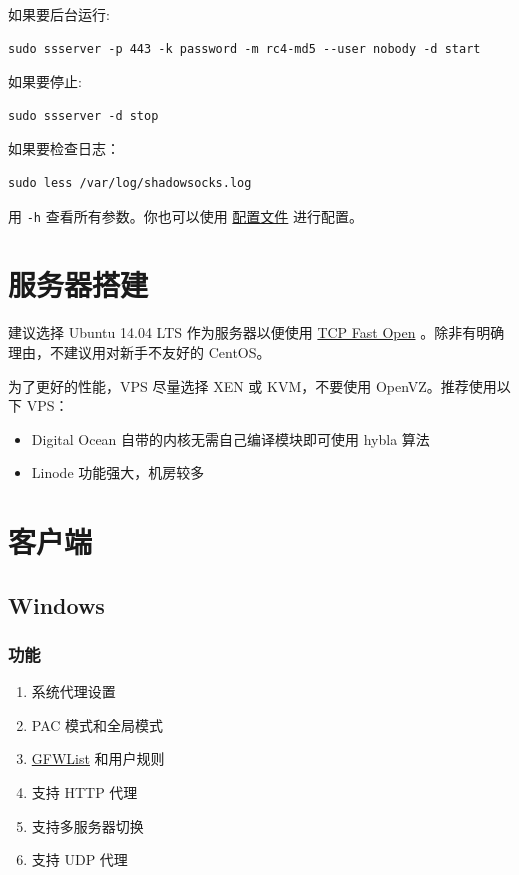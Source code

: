 \documentclass[11pt,a4paper]{sphinxmanual}
\begin{document}
如果要后台运行:
\begin{Verbatim}
sudo ssserver -p 443 -k password -m rc4-md5 --user nobody -d start
\end{Verbatim}

如果要停止:
\begin{Verbatim}
sudo ssserver -d stop
\end{Verbatim}

如果要检查日志：
\begin{Verbatim}
sudo less /var/log/shadowsocks.log
\end{Verbatim}

用 \verb~-h~ 查看所有参数。你也可以使用 \hyperref[sec:cvcf]{配置文件} 进行配置。

\section{服务器搭建}
\label{sec-2-2}
建议选择 Ubuntu 14.04 LTS 作为服务器以便使用 \hyperref[sec:tcp_fast_open]{TCP Fast Open} 。除非有明确理由，不建议用对新手不友好的 CentOS。

为了更好的性能，VPS 尽量选择 XEN 或 KVM，不要使用 OpenVZ。推荐使用以下 VPS：

\begin{itemize}
\item Digital Ocean 自带的内核无需自己编译模块即可使用 hybla 算法
\item Linode 功能强大，机房较多
\end{itemize}


\section{客户端}
\label{sec-2-3}
\subsection{Windows}
\label{sec-2-3-1}
\subsubsection{功能}
\label{sec-2-3-1-1}

\begin{enumerate}
\item 系统代理设置
\item PAC 模式和全局模式
\item \href{https://github.com/gfwlist/gfwlist}{GFWList} 和用户规则
\item 支持 HTTP 代理
\item 支持多服务器切换
\item 支持 UDP 代理
\end{enumerate}
\end{document}
